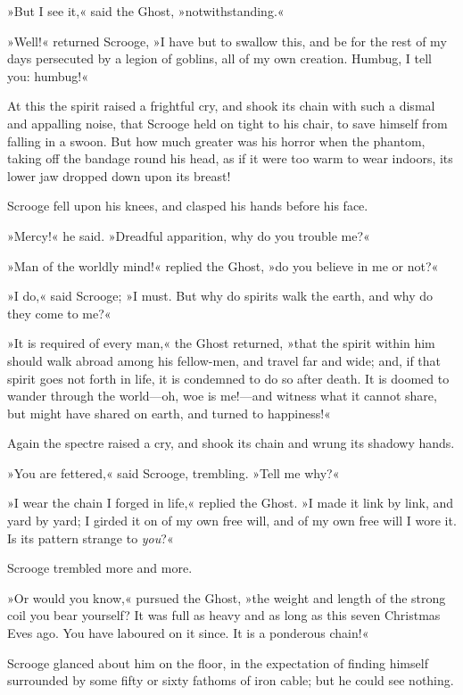 »But I see it,« said the Ghost, »notwithstanding.«

»Well!« returned Scrooge, »I have but to swallow this, and be for the rest of my days persecuted by a legion of goblins, all of my own creation. Humbug, I tell you: humbug!«

At this the spirit raised a frightful cry, and shook its chain with such a dismal and appalling noise, that Scrooge held on tight to his chair, to save himself from falling in a swoon. But how much greater was his horror when the phantom, taking off the bandage round his head, as if it were too warm to wear indoors, its lower jaw dropped down upon its breast!

Scrooge fell upon his knees, and clasped his hands before his face.

»Mercy!« he said. »Dreadful apparition, why do you trouble me?«

»Man of the worldly mind!« replied the Ghost, »do you believe in me or not?«

»I do,« said Scrooge; »I must. But why do spirits walk the earth, and why do they come to me?«

»It is required of every man,« the Ghost returned, »that the spirit within him should walk abroad among his fellow-men, and travel far and wide; and, if that spirit goes not forth in life, it is condemned to do so after death. It is doomed to wander through the world—oh, woe is me!—and witness what it cannot share, but might have shared on earth, and turned to happiness!«

Again the spectre raised a cry, and shook its chain and wrung its shadowy hands.

»You are fettered,« said Scrooge, trembling. »Tell me why?«

»I wear the chain I forged in life,« replied the Ghost. »I made it link by link, and yard by yard; I girded it on of my own free will, and of my own free will I wore it. Is its pattern strange to \textit{you}?«

Scrooge trembled more and more.

»Or would you know,« pursued the Ghost, »the weight and length of the strong coil you bear yourself? It was full as heavy and as long as this seven Christmas Eves ago. You have laboured on it since. It is a ponderous chain!«

Scrooge glanced about him on the floor, in the expectation of finding himself surrounded by some fifty or sixty fathoms of iron cable; but he could see nothing.




